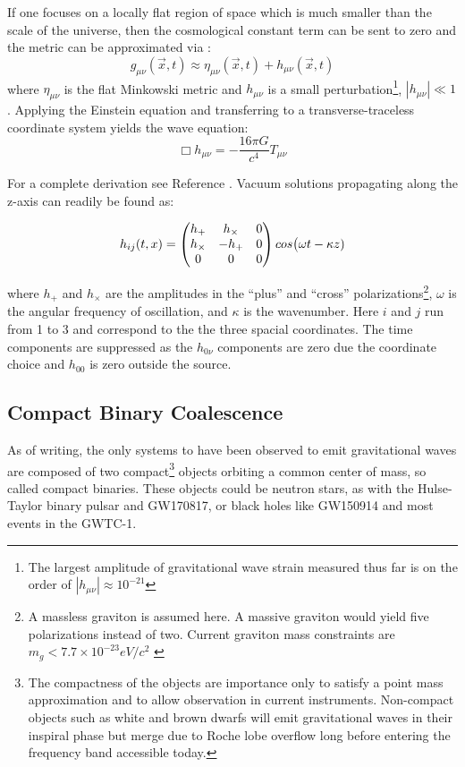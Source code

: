 \documentclass [12pt, proquest]{uwthesis}[2019]
\begin{document}
If one focuses on a locally flat region of space which is much smaller than the scale of the universe, then the cosmological constant term can be sent to zero and the metric can be approximated via \cite{GW}:
\begin{equation}
g_{\mu \nu}(\vec x,t)\approx\eta_{\mu \nu}(\vec x,t)+h_{\mu \nu}(\vec x,t)
\end{equation}
where $\eta_{\mu \nu}$ is the flat Minkowski metric and $h_{\mu \nu}$ is a small perturbation\footnote{The largest amplitude of gravitational wave strain measured thus far is on the order of $|h_{\mu \nu}|\approx 10^{-21}$\cite{GW150914}}, $|h_{\mu \nu}|\ll 1$. Applying the Einstein equation and transferring to a transverse-traceless coordinate system yields the wave equation:
\begin{equation}
\Box h_{\mu \nu}=-\frac{16 \pi G}{c^4}T_{\mu \nu}
\end{equation}

For a complete derivation see Reference \cite{GWbook}. Vacuum solutions propagating along the z-axis can readily be found as:

\begin{equation}
h_{ij}(t,x)=\begin{pmatrix} h_+ & h_\times & 0 \\ h_\times & -h_+ & 0 \\ 0 & 0 & 0\end{pmatrix} \\cos\big(\omega t - \kappa z)
\end{equation}

where $h_+$ and $h_\times$ are the amplitudes in the ``plus'' and ``cross'' polarizations\footnote{A massless graviton is assumed here. A massive graviton would yield five polarizations instead of two. Current graviton mass constraints are $m_g< 7.7\times 10^{-23} eV/c^2$ \cite{some}}, $\omega$ is the angular frequency of oscillation, and $\kappa$ is the wavenumber. Here $i$ and $j$ run from 1 to 3 and correspond to the the three spacial coordinates. The time components are suppressed as the $h_{0\nu}$ components are zero due the coordinate choice and $h_{00}$ is zero outside the source. 

\subsection{Compact Binary Coalescence}\label{CBC}

As of writing, the only systems to have been observed to emit gravitational waves are composed of two compact\footnote{The compactness of the objects are importance only to satisfy a point mass approximation and to allow observation in current instruments. Non-compact objects such as white and brown dwarfs will emit gravitational waves in their inspiral phase but merge due to Roche lobe overflow long before entering the frequency band accessible today.} objects orbiting a common center of mass, so called compact binaries. These objects could be neutron stars, as with the Hulse-Taylor binary pulsar\cite{hulseTaylor} and GW170817\cite{GW170817}, or black holes like GW150914\cite{GW150914} and most events in the GWTC-1\cite{GWTC}.
\end{document}
